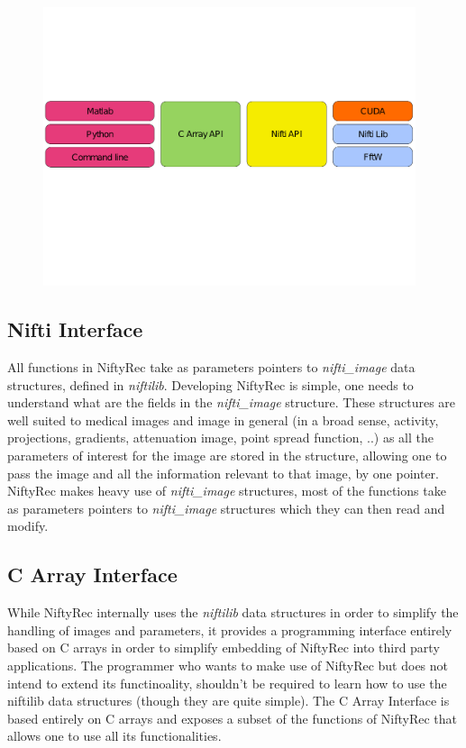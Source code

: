 \documentclass[12pt,a4paper]{report}
\begin{document}
  \begin{figure}[htbp]
    \label{fig:api}
    \begin{center}
      \includegraphics[width=4.3in]{api}
    \end{center}
  \end{figure}

\subsection{Nifti Interface}
All functions in NiftyRec take as parameters pointers to \emph{nifti\_image} data structures, defined in \emph{niftilib}. 
Developing NiftyRec is simple, one needs to understand what are the fields in the \emph{nifti\_image} structure. 
These structures are well suited to medical images and image in general (in a broad sense, activity, projections, gradients, 
attenuation image, point spread function, ..) as all the parameters of interest for the image are 
stored in the structure, allowing one to pass the image and all the information relevant to that image, by one pointer. 
NiftyRec makes heavy use of \emph{nifti\_image} structures, most of the functions take as parameters pointers to \emph{nifti\_image} 
structures which they can then read and modify. 

\subsection{C Array Interface}
While NiftyRec internally uses the \emph{niftilib} data structures in order to simplify the handling of images and parameters, 
it provides a programming interface entirely based on C arrays in order to simplify embedding of NiftyRec into third party applications. 
The programmer who wants to make use of NiftyRec but does not intend to extend its functinoality, shouldn't 
be required to learn how to use the niftilib data structures (though they are quite simple). The C Array Interface is based entirely on 
C arrays and exposes a subset of the functions of NiftyRec that allows one to use all its functionalities. \\
\end{document}
